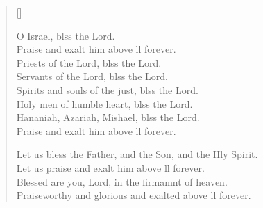 \begin{verse}[\versewidth]
\begin{patverse}
O Israel, blss the Lord.\Med\\
Praise and exalt him above ll forever.\\
Priests of the Lord, blss the Lord.\Med\\
Servants of the Lord, blss the Lord.\\
Spirits and souls of the just, blss the Lord.\Med\\
Holy men of humble heart, blss the Lord.\\
Hananiah, Azariah, Mishael, blss the Lord.\Med\\
Praise and exalt him above ll forever.

Let us bless the Father, and the Son, and the Hly Spirit.\Med\\
Let us praise and exalt him above ll forever.\\
Blessed are you, Lord, in the firmamnt of heaven.\Med\\
Praiseworthy and glorious and exalted above ll forever.
  \end{patverse}
\end{verse}

